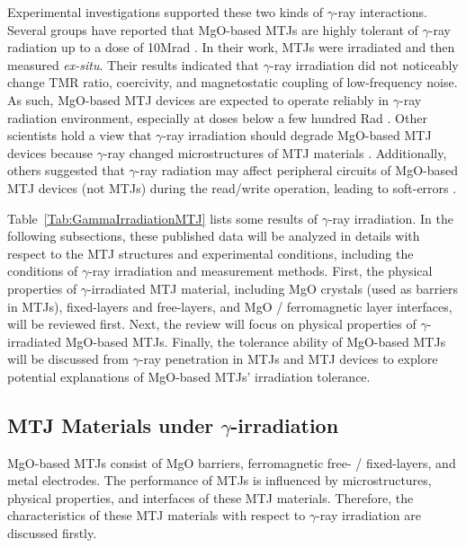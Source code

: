 \documentclass[molecules,review,submit,pdftex,moreauthors]{Definitions/mdpi}
\begin{document}
Experimental investigations supported these two kinds of $\gamma$-ray interactions.  Several groups have reported that MgO-based MTJs are highly tolerant of $\gamma$-ray radiation up to a dose of \unit{10}{Mrad} \cite{Persson2011MST,Ren2012IEEE}.  In their work,  MTJs were irradiated and then measured \textit{ex-situ}.  Their results indicated that $\gamma$-ray irradiation did not noticeably change TMR ratio, coercivity, and magnetostatic coupling of low-frequency noise.  As such, MgO-based MTJ devices are expected to operate reliably in $\gamma$-ray radiation environment, especially at doses below a few hundred Rad \cite{Sinclair2002Conference}.  Other scientists hold a view that $\gamma$-ray irradiation should degrade MgO-based MTJ devices because $\gamma$-ray changed microstructures of MTJ materials \cite{Kvatchadze2011JMSEa}.  Additionally, others suggested that $\gamma$-ray radiation may affect peripheral circuits of MgO-based MTJ devices (not MTJs) during the read/write operation, leading to soft-errors \cite{Kang2014JPd}.  


Table~\ref{Tab:GammaIrradiationMTJ} lists some results of $\gamma$-ray irradiation.  In the following subsections, these published data will be analyzed in details with respect to the MTJ structures and experimental conditions, including the conditions of $\gamma$-ray irradiation and measurement methods.  First, the physical properties of $\gamma$-irradiated MTJ material, including MgO crystals (used as barriers in MTJs), fixed-layers and free-layers, and MgO / ferromagnetic layer interfaces, will be reviewed first.  Next, the review will focus on physical properties of $\gamma$-irradiated MgO-based MTJs.  Finally, the tolerance ability of MgO-based MTJs will be discussed from $\gamma$-ray penetration in MTJs and MTJ devices to explore potential explanations of MgO-based MTJs' irradiation tolerance.


\subsection{MTJ Materials under $\gamma$-irradiation}


MgO-based MTJs consist of MgO barriers, ferromagnetic free- / fixed-layers, and metal electrodes.  The performance of MTJs is influenced by microstructures, physical properties, and interfaces of these MTJ materials.  Therefore, the characteristics of these MTJ materials with respect to $\gamma$-ray irradiation are discussed firstly. 


\vspace{12pt}
\end{document}
